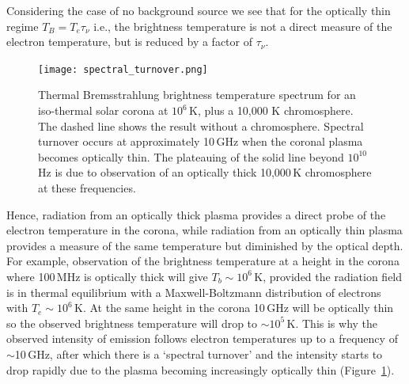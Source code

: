 Considering the case of no background source we see that for the optically thin regime $T_B = T_e\tau_{\nu}$ i.e., the brightness temperature is not a direct measure of the electron temperature, but is reduced by a factor of $\tau_{\nu}$. 
\begin{figure}[t!]
\begin{center}
\texttt{[image: spectral\_turnover.png]}
\caption[Comparison of soft X-ray and low frequency radio observations of the corona]{Thermal Bremsstrahlung brightness temperature spectrum for an iso-thermal solar corona at $10^6$\,K, plus a 10,000 K chromosphere. The dashed line shows 
the result without a chromosphere. Spectral turnover occurs at approximately 10\,GHz when the coronal plasma becomes optically thin. The plateauing of the solid line beyond $10^{10}$\,Hz is due to observation of an optically thick 10,000\,K chromosphere at these frequencies.}
\label{fig:spectral_turnover}
\end{center}
\end{figure}
Hence, radiation from an optically thick plasma provides a direct probe of the electron temperature in the corona, while radiation from an optically thin plasma provides a measure of the same temperature but diminished by the optical depth. For example, observation of the brightness temperature at a height in the corona where 100\,MHz is optically thick will give $T_b\sim10^6$\,K, provided the radiation field is in thermal equilibrium with a Maxwell-Boltzmann distribution of electrons with $T_e\sim10^6$\,K. At the same height in the corona 10\,GHz will be optically thin so the observed brightness temperature will drop to $\sim10^{5}$\,K. This is why the observed intensity of emission follows electron temperatures up to a frequency of $\sim$10\,GHz, after which there is a `spectral turnover' and the intensity starts to drop rapidly due to the plasma becoming increasingly optically thin (Figure~\ref{fig:spectral_turnover}).



